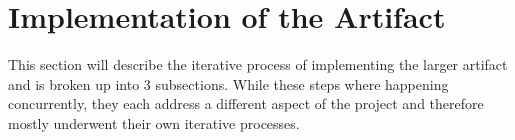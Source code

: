 \section{Implementation of the Artifact}

This section will describe the iterative process of implementing the larger artifact and is broken up into 3 subsections.
While these steps where happening concurrently, they each address a different aspect of the project and therefore mostly underwent their own iterative processes.



\newpage




